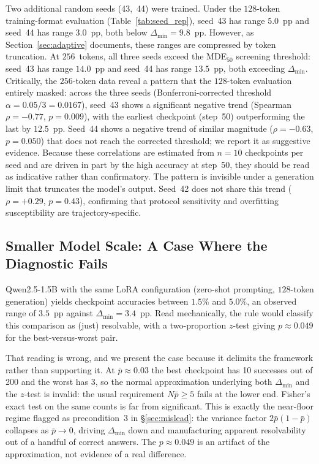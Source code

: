 \documentclass[pdflatex,sn-mathphys-ay,oneside]{sn-jnl}
\theoremstyle{thmstylethree}
\begin{document}
Two additional random seeds (43,~44) were trained. Under the $128$-token training-format evaluation (Table~\ref{tab:seed_rep}), seed~43 has range $5.0$~pp and seed~44 has range $3.0$~pp, both below $\Delta_{\min}=9.8$~pp. However, as Section~\ref{sec:adaptive} documents, these ranges are compressed by token truncation. At $256$~tokens, all three seeds exceed the MDE$_{50}$ screening threshold: seed~43 has range $14.0$~pp and seed~44 has range $13.5$~pp, both exceeding $\Delta_{\min}$. Critically, the $256$-token data reveal a pattern that the $128$-token evaluation entirely masked: across the three seeds (Bonferroni-corrected threshold $\alpha=0.05/3=0.0167$), seed~43 shows a significant negative trend (Spearman $\rho=-0.77$, $p=0.009$), with the earliest checkpoint (step~50) outperforming the last by $12.5$~pp. Seed~44 shows a negative trend of similar magnitude ($\rho=-0.63$, $p=0.050$) that does not reach the corrected threshold; we report it as suggestive evidence. Because these correlations are estimated from $n=10$ checkpoints per seed and are driven in part by the high accuracy at step~50, they should be read as indicative rather than confirmatory. The pattern is invisible under a generation limit that truncates the model's output. Seed~42 does not share this trend ($\rho=+0.29$, $p=0.43$), confirming that protocol sensitivity and overfitting susceptibility are trajectory-specific.

\subsection{Smaller Model Scale: A Case Where the Diagnostic Fails}\label{sec:small_scale}

Qwen2.5-1.5B with the same LoRA configuration (zero-shot prompting, $128$-token generation) yields checkpoint accuracies between $1.5\%$ and $5.0\%$, an observed range of $3.5$~pp against $\Delta_{\min}=3.4$~pp. Read mechanically, the rule would classify this comparison as (just) resolvable, with a two-proportion $z$-test giving $p\approx0.049$ for the best-versus-worst pair.

That reading is wrong, and we present the case because it delimits the framework rather than supporting it. At $\bar p \approx 0.03$ the best checkpoint has 10 successes out of 200 and the worst has 3, so the normal approximation underlying both $\Delta_{\min}$ and the $z$-test is invalid: the usual requirement $N\bar p \geq 5$ fails at the lower end. Fisher's exact test on the same counts is far from significant. This is exactly the near-floor regime flagged as precondition~3 in \S\ref{sec:mislead}: the variance factor $2\bar p(1-\bar p)$ collapses as $\bar p \to 0$, driving $\Delta_{\min}$ down and manufacturing apparent resolvability out of a handful of correct answers. The $p\approx0.049$ is an artifact of the approximation, not evidence of a real difference.
\end{document}
